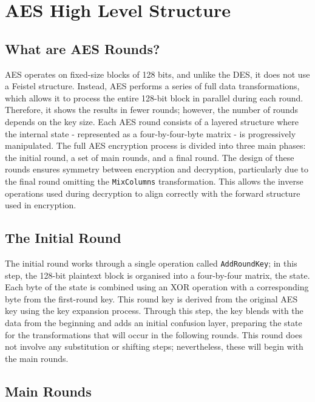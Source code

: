 \section{AES High Level Structure}

\subsection{What are AES Rounds?}

AES operates on fixed-size blocks of 128 bits, and unlike the DES, it does not use a Feistel structure. 
Instead, AES performs a series of full data transformations, 
which allows it to process the entire 128-bit block in parallel during each round. 
Therefore, it shows the results in fewer rounds; however, the number of rounds depends on the key size.
\noindent
Each AES round consists of a layered structure where the internal state 
- represented as a four-by-four-byte matrix - is progressively manipulated. 
The full AES encryption process is divided into three main phases: the initial round, 
a set of main rounds, and a final round.
\noindent
The design of these rounds ensures symmetry between encryption and decryption, 
particularly due to the final round omitting the \texttt{MixColumns} transformation. 
This allows the inverse operations used during decryption to align correctly with the forward structure used in encryption.

\subsection{The Initial Round}

The initial round works through a single operation called \texttt{AddRoundKey}; in this step, 
the 128-bit plaintext block is organised into a four-by-four matrix, the state. 
Each byte of the state is combined using an XOR operation with a corresponding byte from the first-round key. 
This round key is derived from the original AES key using the key expansion process.
\noindent
Through this step, the key blends with the data from the beginning and adds an initial confusion layer, 
preparing the state for the transformations that will occur in the following rounds. 
This round does not involve any substitution or shifting steps; nevertheless, these will begin with the main rounds.

\subsection{Main Rounds}

